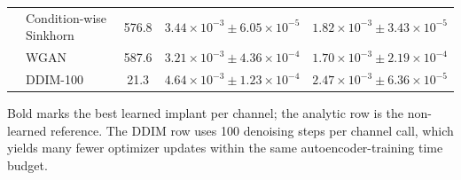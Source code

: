 \begin{table}[t]
{\begin{tabular}{@{}llccc@{}}
& Condition-wise Sinkhorn & 576.8 & $3.44\times 10^{-3}\pm 6.05\times 10^{-5}$ & $1.82\times 10^{-3}\pm 3.43\times 10^{-5}$ \\
& WGAN & 587.6 & \textbf{$3.21\times 10^{-3}\pm 4.36\times 10^{-4}$} & $1.70\times 10^{-3}\pm 2.19\times 10^{-4}$ \\
& DDIM-100 & 21.3 & $4.64\times 10^{-3}\pm 1.23\times 10^{-4}$ & $2.47\times 10^{-3}\pm 6.36\times 10^{-5}$ \\
\bottomrule
\end{tabular}
}
\par\vspace{0.25em}
\begin{minipage}{0.96\textwidth}
\footnotesize\raggedright
Bold marks the best learned implant per channel; the analytic row is the non-learned reference. The DDIM row uses 100 denoising steps per channel call, which yields many fewer optimizer updates within the same autoencoder-training time budget.
\end{minipage}
\end{table}
